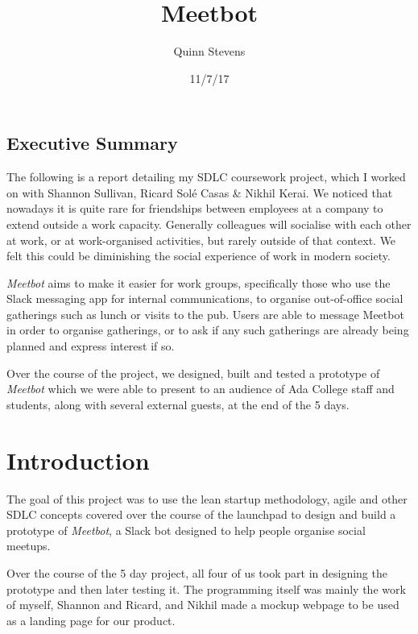\documentclass[12pt]{report}
\author{Quinn Stevens}
\title{Meetbot}
\date{11/7/17}
\begin{document}
\maketitle
\section*{Executive Summary} \label{execsum}
The following is a report detailing my SDLC coursework project, which I worked on with Shannon Sullivan, Ricard Sol\'e Casas \& Nikhil Kerai. We noticed that nowadays it is quite rare for friendships between employees at a company to extend outside a work capacity. Generally colleagues will socialise with each other at work, or at work-organised activities, but rarely outside of that context. We felt this could be diminishing the social experience of work in modern society.

\vspace{3mm}

\emph{Meetbot} aims to make it easier for work groups, specifically those who use the Slack messaging app for internal communications, to organise out-of-office social gatherings such as lunch or visits to the pub. Users are able to message Meetbot in order to organise gatherings, or to ask if any such gatherings are already being planned and express interest if so.

\vspace{3mm}

Over the course of the project, we designed, built and tested a prototype of \emph{Meetbot} which we were able to present to an audience of Ada College staff and students, along with several external guests, at the end of the 5 days.
\tableofcontents

\chapter{Introduction} \label{intro}
The goal of this project was to use the lean startup methodology, agile and other SDLC concepts covered over the course of the launchpad to design and build a prototype of \emph{Meetbot}, a Slack bot designed to help people organise social meetups.

\vspace{3mm}

Over the course of the 5 day project, all four of us took part in designing the prototype and then later testing it. The programming itself was mainly the work of myself, Shannon and Ricard, and Nikhil made a mockup webpage to be used as a landing page for our product.
\end{document}
